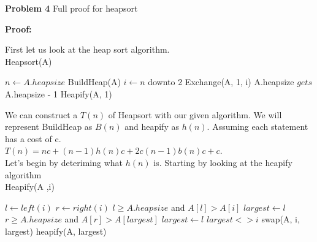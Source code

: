 \documentclass[12pt]{article}
\begin{document}
\par
\bigskip
{\bf Problem
    4
}
Full proof for heapsort
\par
\bigskip
{\bf Proof:}
\par
First let us look at the heap sort algorithm.\\
\hline
Heapsort(A)
\hline
\begin{algorithmic}
    \State $n \gets A.heapsize$
    \State BuildHeap(A)
    \For $i \gets n$ downto 2
        \State Exchange(A, 1, i)
        \State A.heapsize $gets $ A.heapsize - 1
        \State Heapify(A, 1)
\end{algorithmic}

We can construct a $T(n)$ of Heapsort with our given algorithm.
We will represent BuildHeap as $B(n)$ and heapify as $h(n)$.
Assuming each statement has a cost of c.\\

$T(n) = nc + (n-1)h(n)c + 2c(n - 1) b(n)c + c$.\\

Let's begin by deteriming what $h(n)$ is. Starting by looking at the 
heapify algorithm\\
\hline
Heapify(A ,i)
\hline
\begin{algorithmic}
    \State $l \gets left(i)$
    \State $r \gets right(i)$
    \If $l \ge A.heapsize$ and $A[l] > A[i]$
        \state $largest \gets l$
    \If $r \ge A.heapsize$ and $A[r] > A[largest]$
        \state $largest \gets l$
    \If $largest <> i$
        \state swap(A, i, largest)
        \state heapify(A, largest)
\end{algorithmic}

\rightline{$\blacksquare$}

\par
\end{document}
